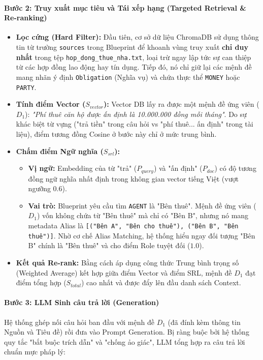 \paragraph{Bước 2: Truy xuất mục tiêu và Tái xếp hạng (Targeted Retrieval \& Re-ranking)}
\begin{itemize}
    \item \textbf{Lọc cứng (Hard Filter):} Đầu tiên, cơ sở dữ liệu ChromaDB sử dụng thông tin từ trường \texttt{sources} trong Blueprint để khoanh vùng truy xuất \textbf{chỉ duy nhất} trong tệp \texttt{hop\_dong\_thue\_nha.txt}, loại trừ ngay lập tức sự can thiệp từ các hợp đồng lao động hay tín dụng. Tiếp đó, nó chỉ giữ lại các mệnh đề mang nhãn ý định \texttt{Obligation} (Nghĩa vụ) và chứa thực thể \texttt{MONEY} hoặc \texttt{PARTY}.
    \item \textbf{Tính điểm Vector ($S_{vector}$):} Vector DB lấy ra được một mệnh đề ứng viên ($D_1$): \textit{"Phí thuê căn hộ được ấn định là 10.000.000 đồng mỗi tháng"}. Do sự khác biệt từ vựng ("trả tiền" trong câu hỏi vs "phí thuê... ấn định" trong tài liệu), điểm tương đồng Cosine ở bước này chỉ ở mức trung bình.
    \item \textbf{Chấm điểm Ngữ nghĩa ($S_{srl}$):} 
    \begin{itemize}
        \item \textbf{Vị ngữ:} Embedding của từ "trả" ($P_{query}$) và "ấn định" ($P_{doc}$) có độ tương đồng ngữ nghĩa nhất định trong không gian vector tiếng Việt (vượt ngưỡng 0.6).
        \item \textbf{Vai trò:} Blueprint yêu cầu tìm \texttt{AGENT} là "Bên thuê". Mệnh đề ứng viên ($D_1$) vốn không chứa từ "Bên thuê" mà chỉ có "Bên B", nhưng nó mang metadata Alias là \texttt{[("Bên A", "Bên cho thuê"), ("Bên B", "Bên thuê")]}. Nhờ cơ chế Alias Matching, hệ thống hiểu ngay đối tượng "Bên B" chính là "Bên thuê" và cho điểm Role tuyệt đối ($1.0$).
    \end{itemize}
    \item \textbf{Kết quả Re-rank:} Bằng cách áp dụng công thức Trung bình trọng số (Weighted Average) kết hợp giữa điểm Vector và điểm SRL, mệnh đề $D_1$ đạt điểm tổng hợp ($S_{total}$) cao nhất và được đẩy lên đầu danh sách Context.
\end{itemize}

\paragraph{Bước 3: LLM Sinh câu trả lời (Generation)}
Hệ thống ghép nối câu hỏi ban đầu với mệnh đề $D_1$ (đã đính kèm thông tin Nguồn và Tiêu đề) rồi đưa vào Prompt Generation. Bị ràng buộc bởi hệ thống quy tắc "bắt buộc trích dẫn" và "chống ảo giác", LLM tổng hợp ra câu trả lời chuẩn mực pháp lý:

